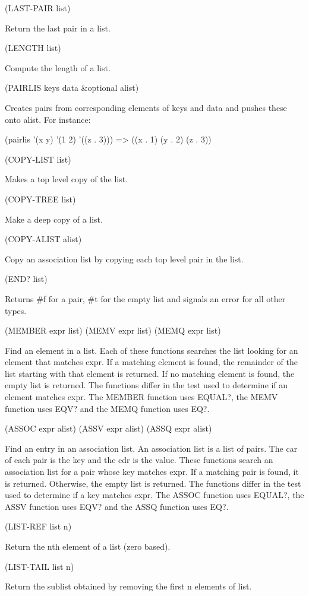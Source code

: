 \documentclass[11pt]{article}
\begin{document}
(LAST-PAIR list)

Return the last pair in a list.

(LENGTH list)

Compute the length of a list.

(PAIRLIS keys data \&optional alist)

Creates pairs from corresponding elements of keys and data and pushes
these onto alist.  For instance:

(pairlis '(x y) '(1 2) '((z . 3)))  =>  ((x . 1) (y . 2) (z . 3))

(COPY-LIST list)

Makes a top level copy of the list.

(COPY-TREE list)

Make a deep copy of a list.

(COPY-ALIST alist)

Copy an association list by copying each top level pair in the list.

(END? list)

Returns \#f for a pair, \#t for the empty list and signals an error for
all other types.

(MEMBER expr list)
(MEMV expr list)
(MEMQ expr list)

Find an element in a list. Each of these functions searches the list
looking for an element that matches expr. If a matching element is
found, the remainder of the list starting with that element is
returned. If no matching element is found, the empty list is
returned. The functions differ in the test used to determine if an
element matches expr. The MEMBER function uses EQUAL?, the MEMV function
uses EQV? and the MEMQ function uses EQ?.

(ASSOC expr alist)
(ASSV expr alist)
(ASSQ expr alist)

Find an entry in an association list. An association list is a list of
pairs. The car of each pair is the key and the cdr is the value. These
functions search an association list for a pair whose key matches
expr. If a matching pair is found, it is returned. Otherwise, the empty
list is returned. The functions differ in the test used to determine if
a key matches expr. The ASSOC function uses EQUAL?, the ASSV function
uses EQV? and the ASSQ function uses EQ?.

(LIST-REF list n)

Return the nth element of a list (zero based).

(LIST-TAIL list n)

Return the sublist obtained by removing the first n elements of list.
\end{document}
